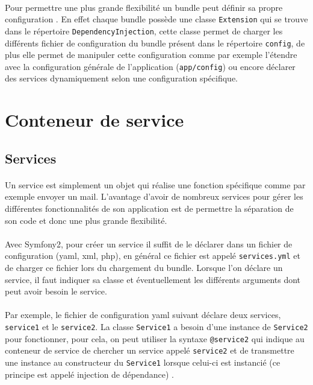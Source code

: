 \paragraph{}
\label{configuration}
Pour permettre une plus grande flexibilité un bundle peut définir sa propre configuration . En effet chaque bundle possède une classe \verb?Extension? qui se trouve dans le répertoire \verb?DependencyInjection?, cette classe permet de charger les différents fichier de configuration du bundle présent dans le répertoire \verb?config?, de plus elle permet de manipuler cette configuration comme par exemple l'étendre avec la configuration générale de l'application (\verb?app/config?) ou encore déclarer des services dynamiquement selon une configuration spécifique.
\section{Conteneur de service}

\subsection{Services}
\paragraph{}
Un service est simplement un objet qui réalise une fonction spécifique comme par exemple envoyer un mail. L'avantage d'avoir de nombreux services pour gérer les différentes fonctionnalités de son application est de permettre la séparation de son code et donc une plus grande flexibilité.
\paragraph{}
Avec Symfony2, pour créer un service il suffit de le déclarer dans un fichier de configuration (yaml, xml, php), en général ce fichier est appelé \verb?services.yml?
et de charger ce fichier lors du chargement du bundle.
Lorsque l'on déclare un service, il faut indiquer sa classe et éventuellement les différents arguments dont peut avoir besoin le service.
\paragraph{}
Par exemple, le fichier de configuration yaml suivant déclare deux services, \verb?service1? et le \verb?service2?.
La classe \verb?Service1? a besoin d'une instance de \verb?Service2? pour fonctionner, pour cela, on peut utiliser la syntaxe \verb?@service2? qui indique au conteneur de service de chercher un service appelé \verb?service2? et de transmettre une instance au constructeur du \verb?Service1? lorsque celui-ci est instancié (ce principe est appelé injection de dépendance) .

